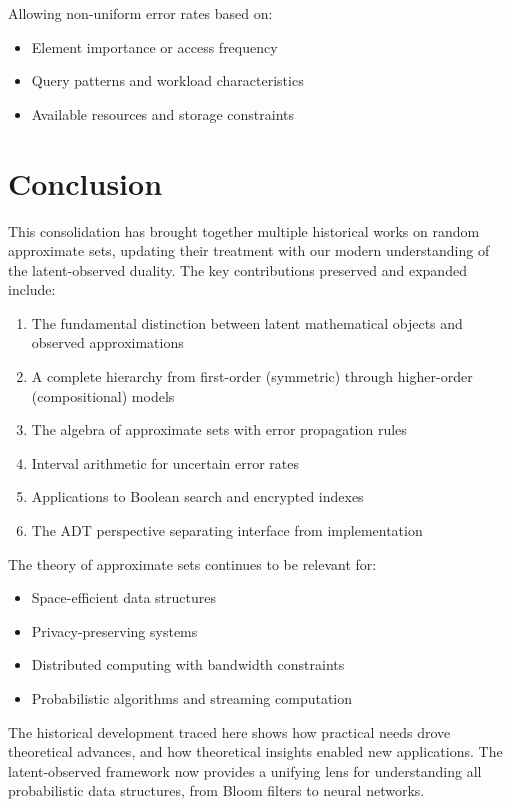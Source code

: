 \documentclass[11pt]{article}
\begin{document}
Allowing non-uniform error rates based on:
\begin{itemize}
\item Element importance or access frequency
\item Query patterns and workload characteristics
\item Available resources and storage constraints
\end{itemize}

\section{Conclusion}
\label{sec:conclusion}

This consolidation has brought together multiple historical works on random approximate sets, updating their treatment with our modern understanding of the latent-observed duality. The key contributions preserved and expanded include:

\begin{enumerate}
\item The fundamental distinction between latent mathematical objects and observed approximations
\item A complete hierarchy from first-order (symmetric) through higher-order (compositional) models
\item The algebra of approximate sets with error propagation rules
\item Interval arithmetic for uncertain error rates
\item Applications to Boolean search and encrypted indexes
\item The ADT perspective separating interface from implementation
\end{enumerate}

The theory of approximate sets continues to be relevant for:
\begin{itemize}
\item Space-efficient data structures
\item Privacy-preserving systems
\item Distributed computing with bandwidth constraints
\item Probabilistic algorithms and streaming computation
\end{itemize}

The historical development traced here shows how practical needs drove theoretical advances, and how theoretical insights enabled new applications. The latent-observed framework now provides a unifying lens for understanding all probabilistic data structures, from Bloom filters to neural networks.
\end{document}
